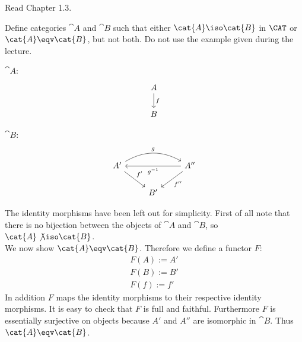\def\pathToRoot{../../}



\author{Joachim Bard, Maximilian Wuttke, Nikita Ziuzin}


\begin{hint}
  Read Chapter 1.3.
\end{hint}

\begin{exercise}
  Define categories $\cat{A}$ and $\cat{B}$ such that either $\cat{A} \iso \cat{B}$ in $\CAT$ or $\cat{A} \eqv \cat{B}$, but not both.
  Do not use the example given during the lecture.
\end{exercise}
\begin{answer}
    \begin{minipage}{0.5\textwidth}
        $\cat{A}$:
        \[
            \begin{tikzcd}
                A \arrow{d}{f}\\
                B
            \end{tikzcd}
        \]
    \end{minipage}
    \begin{minipage}{0.5\textwidth}
        $\cat{B}$:
        \[
            \begin{tikzcd}
                A' \arrow{dr}{f'} \arrow[bend left]{rr}{g} &    & A'' \arrow{dl}{f''} \arrow{ll}{g^{-1}} \\
                                                           & B' &
            \end{tikzcd}
        \]
    \end{minipage}
    The identity morphisms have been left out for simplicity.
    First of all note that there is no bijection between the objects of $\cat{A}$ and $\cat{B}$, so $\cat{A} \not\iso \cat{B}$.\\
    We now show $\cat{A} \eqv \cat{B}$.
    Therefore we define a functor $F$:
    \begin{align*}
        F(A) := A'\\
        F(B) := B'\\
        F(f) := f'
    \end{align*}
    In addition $F$ maps the identity morphisms to their respective identity morphisms.
    It is easy to check that $F$ is full and faithful.
    Furthermore $F$ is essentially surjective on objects because $A'$ and $A''$ are isomorphic in $\cat{B}$.
    Thus $\cat{A} \eqv \cat{B}$.
\end{answer}

